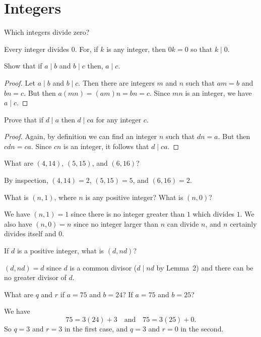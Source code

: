 \chapter{Integers}

 Which integers divide zero?
\begin{solution}
  Every integer divides $0$. For, if $k$ is any integer, then $0k = 0$
  so that $k\mid0$.
\end{solution}

 Show that if $a\mid b$ and $b\mid c$ then, $a\mid c$.
\begin{proof}
  Let $a\mid b$ and $b\mid c$. Then there are integers $m$ and $n$
  such that $am = b$ and $bn = c$. But then $a(mn) = (am)n = bn =
  c$. Since $mn$ is an integer, we have $a\mid c$.
\end{proof}

 Prove that if $d\mid a$ then $d\mid ca$ for any integer $c$.
\begin{proof}
  Again, by definition we can find an integer $n$ such that $dn =
  a$. But then $cdn = ca$. Since $cn$ is an integer, it follows that
  $d\mid ca$.
\end{proof}

 What are $(4,14)$, $(5,15)$, and $(6,16)$?
\begin{solution}
  By inspection, $(4,14) = 2$, $(5,15) = 5$, and $(6,16) = 2$.
\end{solution}

 What is $(n,1)$, where $n$ is any positive integer? What is
$(n,0)$?
\begin{solution}
  We have $(n,1) = 1$ since there is no integer greater than $1$ which
  divides $1$. We also have $(n,0) = n$ since no integer larger than
  $n$ can divide $n$, and $n$ certainly divides itself and $0$.
\end{solution}

 If $d$ is a positive integer, what is $(d, nd)$?
\begin{solution}
  $(d,nd) = d$ since $d$ is a common divisor ($d\mid nd$ by Lemma~2)
  and there can be no greater divisor of $d$.
\end{solution}

 What are $q$ and $r$ if $a = 75$ and $b = 24$? If $a = 75$
and $b = 25$?
\begin{solution}
  We have
  \begin{equation*}
    75 = 3(24) + 3
    \quad\text{and}\quad
    75 = 3(25) + 0.
  \end{equation*}
  So $q = 3$ and $r = 3$ in the first case, and $q = 3$ and $r = 0$ in
  the second.
\end{solution}

